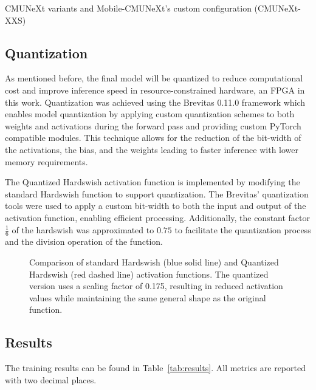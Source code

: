 \documentclass[lettersize,journal]{IEEEtran}
\begin{document}
\begin{table}[t]
    \fittowidth{}
    \caption{CMUNeXt variants and Mobile-CMUNeXt's custom configuration (CMUNeXt-XXS)} 
    \label{tab:variants}
\end{table}


\subsection{Quantization}
As mentioned before, the final model will be quantized to reduce computational cost and improve inference speed in resource-constrained hardware, an FPGA in this work. Quantization was achieved using the  Brevitas 0.11.0 \cite{brevitas} framework which enables model quantization by applying custom quantization schemes to both weights and activations during the forward pass and providing custom PyTorch compatible modules. This technique allows for the reduction of the bit-width of the activations, the bias, and the weights leading to faster inference with lower memory requirements.

The Quantized Hardswish activation function is implemented by modifying the standard Hardswish function to support quantization. The Brevitas' quantization tools were used to apply a custom bit-width to both the input and output of the activation function, enabling efficient processing. Additionally, the constant factor $\frac{1}{6}$ of the hardswish was approximated to $0.75$ to facilitate the quantization process and the division operation of the function.

\begin{figure}[htbp!]
    \centerline{}
\caption{Comparison of standard Hardswish (blue solid line) and Quantized Hardswish (red dashed line) activation functions. The quantized version uses a scaling factor of 0.175, resulting in reduced activation values while maintaining the same general shape as the original function.}
\label{fig:hardswish-comparison}
\end{figure}



\subsection{Results}
The training results can be found in Table~\ref{tab:results}. All metrics are reported with two decimal places. 
\end{document}
